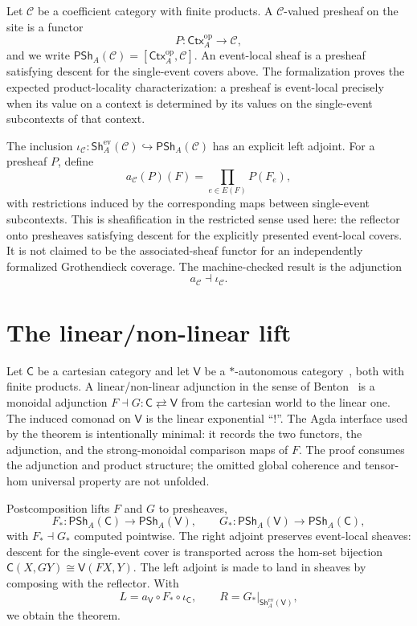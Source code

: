 \documentclass[11pt]{article}
\newcommand{\PSh}{\mathsf{PSh}}
\newcommand{\EvSh}{\mathsf{Sh}^{\mathrm{ev}}}
\newcommand{\Ctx}{\mathsf{Ctx}}
\newcommand{\Cart}{\mathsf{C}}
\newcommand{\Vcat}{\mathsf{V}}
\newcommand{\op}{\mathrm{op}}
\begin{document}
Let $\mathcal C$ be a coefficient category with finite products. A
$\mathcal C$-valued presheaf on the site is a functor
\[
  P : \Ctx_A^{\op}\longrightarrow\mathcal C,
\]
and we write $\PSh_A(\mathcal C)=[\Ctx_A^{\op},\mathcal C]$. An event-local
sheaf is a presheaf satisfying descent for the single-event covers above. The
formalization proves the expected product-locality characterization: a presheaf
is event-local precisely when its value on a context is determined by its values
on the single-event subcontexts of that context.

The inclusion
$\iota_{\mathcal C}:\EvSh_A(\mathcal C)\hookrightarrow\PSh_A(\mathcal C)$ has an
explicit left adjoint. For a presheaf $P$, define
\[
  a_{\mathcal C}(P)(F)=\prod_{e\in E(F)} P(F_e),
\]
with restrictions induced by the corresponding maps between single-event
subcontexts. This is sheafification in the restricted sense used here: the
reflector onto presheaves satisfying descent for the explicitly presented
event-local covers. It is not claimed to be the associated-sheaf functor for an
independently formalized Grothendieck coverage. The machine-checked result is
the adjunction
\[
  a_{\mathcal C}\dashv\iota_{\mathcal C}.
\]

\section*{The linear/non-linear lift}

Let $\Cart$ be a cartesian category and let $\Vcat$ be a $*$-autonomous
category~\cite{Barr1979}, both with finite products. A linear/non-linear
adjunction in the sense of Benton~\cite{Benton1995} is a monoidal adjunction
$F\dashv G:\Cart\rightleftarrows\Vcat$ from the cartesian world to the linear
one. The induced comonad on $\Vcat$ is the linear exponential ``$!$''. The Agda
interface used by the theorem is intentionally minimal: it records the two
functors, the adjunction, and the strong-monoidal comparison maps of $F$. The
proof consumes the adjunction and product structure; the omitted global
coherence and tensor-hom universal property are not unfolded.

Postcomposition lifts $F$ and $G$ to presheaves,
\[
  F_* : \PSh_A(\Cart)\to\PSh_A(\Vcat),
  \qquad
  G_* : \PSh_A(\Vcat)\to\PSh_A(\Cart),
\]
with $F_*\dashv G_*$ computed pointwise. The right adjoint preserves
event-local sheaves: descent for the single-event cover is transported across
the hom-set bijection $\Cart(X,GY)\cong\Vcat(FX,Y)$. The left adjoint is made to
land in sheaves by composing with the reflector. With
\[
  L=a_{\Vcat}\circ F_*\circ\iota_{\Cart},
  \qquad
  R=G_*|_{\EvSh_A(\Vcat)},
\]
we obtain the theorem.
\end{document}
